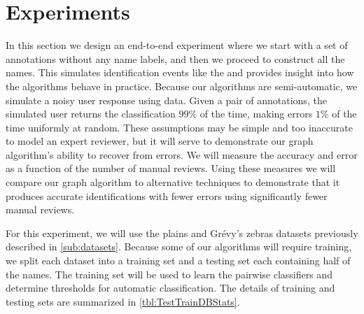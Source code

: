 \poisson{}




\section{Experiments}\label{sec:graphexpt}

    In this section we design an end-to-end experiment where we start with a set of annotations without any name
      labels, and then we proceed to construct all the names.
    This simulates identification events like the \GZC{} and provides insight into how the algorithms behave in
      practice.
    Because our algorithms are semi-automatic, we simulate a noisy user response using \groundtruth{} data.
    Given a pair of annotations, the simulated user returns the \groundtruth{} classification $99\percent$ of the
      time, making errors $1\percent$ of the time uniformly at random.
    These assumptions may be simple and too inaccurate to model an expert reviewer, but it will serve to
      demonstrate our graph algorithm's ability to recover from errors.
    We will measure the accuracy and error as a function of the number of manual reviews.
    Using these measures we will compare our graph algorithm to alternative techniques to demonstrate that it
      produces accurate identifications with fewer errors using significantly fewer manual reviews.

    For this experiment, we will use the plains and Grévy's zebras datasets previously described in
      \cref{sub:datasets}.
    Because some of our algorithms will require training, we split each dataset into a training set and a testing
      set each containing half of the names.
    The training set will be used to learn the pairwise classifiers and determine thresholds for automatic
      classification.
    The details of training and testing sets are summarized in \cref{tbl:TestTrainDBStats}.
    \TestTrainDBStats{}
    \FloatBarrier{}

